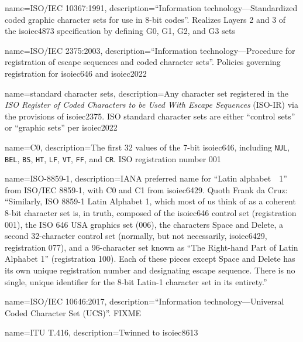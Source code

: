{
  name={ISO/IEC 10367:1991},
  description={``Information technology---Standardized coded graphic character sets for use in 8-bit codes''.
    Realizes Layers 2 and 3 of the \Gls{isoiec4873} specification by defining
    G0, G1, G2, and G3 sets}
}

{
  name={ISO/IEC 2375:2003},
  description={``Information technology---Procedure for registration of escape sequences and coded character sets''.
   Policies governing registration for \Gls{isoiec646} and \Gls{isoiec2022}}
}

{
  name={standard character sets},
  description={Any character set registered in the \textit{ISO Register of Coded
               Characters to be Used With Escape Sequences} (ISO-IR) via the
             provisions of \Gls{isoiec2375}. ISO standard character sets are
             either ``control sets'' or ``graphic sets'' per \Gls{isoiec2022}}
}

{
  name={C0},
  description={The first 32 values of the 7-bit \Gls{isoiec646}, including
    \texttt{NUL}, \texttt{BEL}, \texttt{BS}, \texttt{HT}, \texttt{LF},
    \texttt{VT}, \texttt{FF}, and \texttt{CR}. ISO registration number 001}
}

{
  name={ISO-8859-1},
  description={IANA preferred name for ``Latin alphabet~\textnumero\ 1'' from ISO/IEC 8859-1,
    with \Gls{C0} and C1 from \Gls{isoiec6429}. Quoth Frank da Cruz:
    ``Similarly, ISO 8859-1 Latin Alphabet 1, which most of us think of as a
    coherent 8-bit character set is, in truth, composed of the \Gls{isoiec646}
    control set (registration 001), the ISO 646 USA graphics set (006), the
    characters Space and Delete, a second 32-character control set (normally,
    but not necessarily, \Gls{isoiec6429}, registration 077), and a 96-character set
    known as ``The Right-hand Part of Latin Alphabet 1'' (registration 100). Each of
    these pieces except Space and Delete has its own unique registration number
    and designating escape sequence. There is no single, unique identifier for
    the 8-bit Latin-1 character set in its entirety\cite{interchange}.''
  }
}

{
  name={ISO/IEC 10646:2017},
  description={``Information technology---Universal Coded Character Set (UCS)''.
    FIXME
    }
}

{
  name={ITU T.416},
  description={Twinned to \Gls{isoiec8613}}
}

